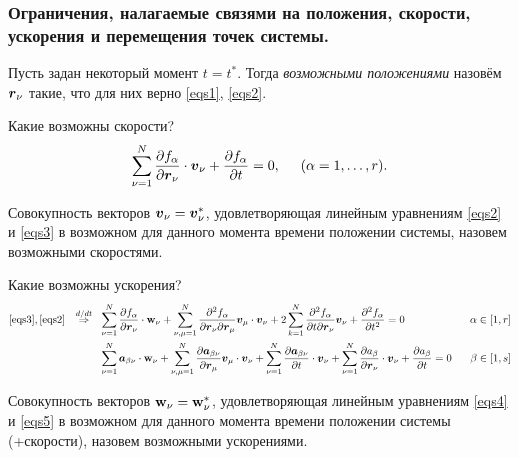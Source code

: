\subsubsection*{Ограничения, налагаемые связями на положения, скорости, ускорения и перемещения точек системы.}

Пусть задан некоторый момент $t = t^*$. Тогда \textit{возможными положениями} назовём $\mbox{\boldmath $r$}_\nu$ такие, что для них верно \eqref{eqs1}, \eqref{eqs2}. 

Какие возможны скорости?
\begin{equation}
    \label{eqs3}
    \sum_{\nu=1}^N \frac{\partial f_\alpha}{\partial \mbox{\boldmath $r$}_\nu} \cdot \mbox{\boldmath $v$}_\nu +   \frac{\partial f_\alpha}{\partial t} = 0, \hspace{0.5cm} (\alpha = 1, \ldots, r).
\end{equation}

Совокупность векторов $\mbox{\boldmath $v$}_\nu = \mbox{\boldmath $v$}_\nu^*$, удовлетворяющая линейным
уравнениям \eqref{eqs2} и \eqref{eqs3} в возможном для данного момента времени положении
системы, назовем возможными скоростями. 

Какие возможны ускорения?
\begin{align}
\label{eqs4}
    \eqref{eqs3}, \eqref{eqs2}
    \hspace{0.25cm} \overset{d / dt}{\Rightarrow} \hspace{0.25cm} 
    & \sum_{\nu=1}^N \frac{\partial f_\alpha}{\partial \mbox{\boldmath $r$}_\nu} \cdot \mbox{\boldmath $\mathrm{w}$}_\nu +
    \sum_{\nu, \mu=1}^N \frac{\partial^2 f_\alpha}{\partial \mbox{\boldmath $r$}_\nu \partial \mbox{\boldmath $r$}_\mu} \mbox{\boldmath $v$}_\mu \cdot \mbox{\boldmath $v$}_\nu + 2 \sum_{k=1}^N \frac{\partial^2 f_\alpha}{\partial t \partial \mbox{\boldmath $r$}_\nu} \mbox{\boldmath $v$}_\nu + \frac{\partial^2 f_\alpha}{\partial t^2}  = 0 
    \hspace{0.25cm} &\alpha \in [1, r]\\
\label{eqs5}
    & \sum_{\nu=1}^N \mbox{\boldmath $a$}_{\beta\nu} \cdot \mbox{\boldmath $\mathrm{w}$}_\nu + \sum_{\nu, \mu =1}^N \frac{\partial \mbox{\boldmath $a$}_{\beta\nu}}{\partial \mbox{\boldmath $r$}_\mu} \mbox{\boldmath $v$}_\mu \cdot \mbox{\boldmath $v$}_\nu + \sum_{\nu=1}^N \frac{\partial \mbox{\boldmath $a$}_{\beta\nu}}{\partial t} \cdot \mbox{\boldmath $v$}_\nu + \sum_{\nu=1}^N \frac{\partial a_\beta}{\partial \mbox{\boldmath $r$}_\nu} \cdot \mbox{\boldmath $v$}_\nu + \frac{\partial  a_\beta}{\partial t} = 0
     \hspace{0.25cm} &\beta \in [1, s]
\end{align}

Совокупность векторов $\mbox{\boldmath $\mathrm{w}$}_\nu =\mbox{\boldmath $\mathrm{w}$}_\nu^*$, удовлетворяющая линейным
уравнениям \eqref{eqs4} и \eqref{eqs5} в возможном для данного момента времени положении
системы (+скорости), назовем возможными ускорениями. 

